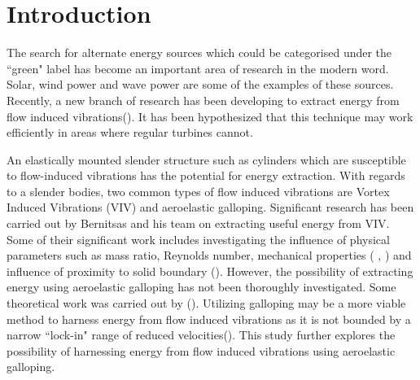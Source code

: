 \section{Introduction} 

The search for alternate energy sources which could be categorised  under the ``green" label has become an important area of research in the modern word. Solar, wind power and wave power are some of the examples of these sources.  Recently, a new branch of research has been developing to extract energy from flow induced vibrations(\cite{Bernitsas2008a-concept}). It has been hypothesized that this technique may work efficiently in areas where regular turbines cannot. 

An elastically mounted slender structure such as cylinders which  are susceptible to flow-induced vibrations has the potential for energy extraction. With regards to a slender bodies, two common types of   flow induced vibrations are Vortex Induced Vibrations (VIV) and aeroelastic galloping. Significant research has been carried out by Bernitsas and his team on extracting useful energy from VIV. Some of their significant work includes investigating the influence  of physical parameters such as mass ratio, Reynolds number, mechanical properties (\cite{Raghavan2010a} , \cite{Lee2011b}) and influence of proximity to solid boundary (\cite{Raghavan2009}). However, the possibility of extracting energy using aeroelastic galloping has not been thoroughly investigated. Some theoretical work was carried out by (\cite{Barrero-Gil2010a}). Utilizing galloping may be a more viable method to harness energy from flow induced vibrations as it is not bounded by a narrow ``lock-in" range of reduced velocities(\ustar). This study further explores the possibility of harnessing energy from flow induced vibrations using aeroelastic galloping.

